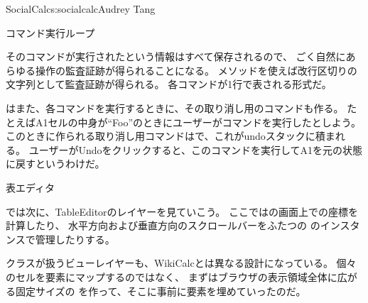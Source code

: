 \begin{aosachapter}{SocialCalc}{s:socialcalc}{Audrey Tang}
\begin{aosasect1}{コマンド実行ループ}
\begin{aosadescription}
\end{aosadescription}

そのコマンドが実行されたという情報はすべて保存されるので、
ごく自然にあらゆる操作の監査証跡が得られることになる。
メソッドを使えば改行区切りの文字列として監査証跡が得られる。
各コマンドが1行で表される形式だ。

はまた、各コマンドを実行するときに、その取り消し用のコマンドも作る。
たとえばA1セルの中身が``Foo''のときにユーザーがコマンドを実行したとしよう。
このときに作られる取り消し用コマンドはで、これがundoスタックに積まれる。
ユーザーがUndoをクリックすると、このコマンドを実行してA1を元の状態に戻すというわけだ。

\end{aosasect1}

\begin{aosasect1}{表エディタ}

では次に、TableEditorのレイヤーを見ていこう。
ここではの画面上での座標を計算したり、
水平方向および垂直方向のスクロールバーをふたつの
のインスタンスで管理したりする。


クラスが扱うビューレイヤーも、WikiCalcとは異なる設計になっている。
個々のセルを要素にマップするのではなく、
まずはブラウザの表示領域全体に広がる固定サイズの
を作って、そこに事前に要素を埋めていったのだ。


\end{aosasect1}
\end{aosachapter}
